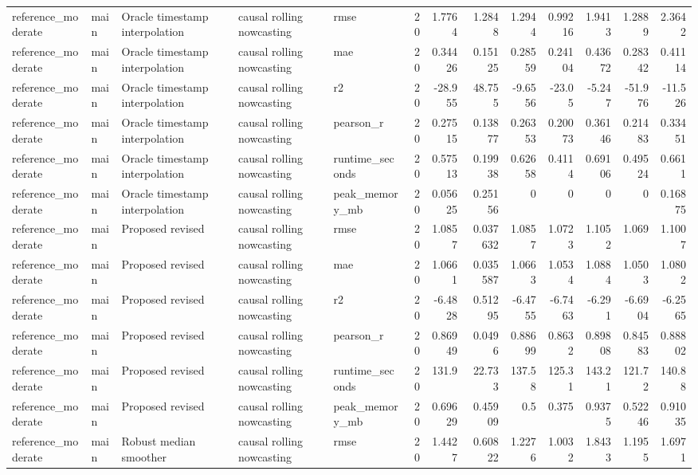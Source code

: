 \begin{table}[!htbp]
{{\begin{tabular}{lllllrrrrrrrr}
reference_moderate & main & Oracle timestamp interpolation & causal rolling nowcasting & rmse & 20 & 1.7764 & 1.2848 & 1.2944 & 0.99216 & 1.9413 & 1.2889 & 2.3642 \\
reference_moderate & main & Oracle timestamp interpolation & causal rolling nowcasting & mae & 20 & 0.34426 & 0.15125 & 0.28559 & 0.24104 & 0.43672 & 0.28342 & 0.41114 \\
reference_moderate & main & Oracle timestamp interpolation & causal rolling nowcasting & r2 & 20 & -28.955 & 48.755 & -9.6556 & -23.05 & -5.247 & -51.976 & -11.526 \\
reference_moderate & main & Oracle timestamp interpolation & causal rolling nowcasting & pearson_r & 20 & 0.27515 & 0.13877 & 0.26353 & 0.20073 & 0.36146 & 0.21483 & 0.33451 \\
reference_moderate & main & Oracle timestamp interpolation & causal rolling nowcasting & runtime_seconds & 20 & 0.57513 & 0.19938 & 0.62658 & 0.4114 & 0.69106 & 0.49524 & 0.6611 \\
reference_moderate & main & Oracle timestamp interpolation & causal rolling nowcasting & peak_memory_mb & 20 & 0.05625 & 0.25156 & 0 & 0 & 0 & 0 & 0.16875 \\
reference_moderate & main & Proposed revised & causal rolling nowcasting & rmse & 20 & 1.0857 & 0.037632 & 1.0857 & 1.0723 & 1.1052 & 1.069 & 1.1007 \\
reference_moderate & main & Proposed revised & causal rolling nowcasting & mae & 20 & 1.0661 & 0.035587 & 1.0663 & 1.0534 & 1.0884 & 1.0503 & 1.0802 \\
reference_moderate & main & Proposed revised & causal rolling nowcasting & r2 & 20 & -6.4828 & 0.51295 & -6.4755 & -6.7463 & -6.291 & -6.6904 & -6.2565 \\
reference_moderate & main & Proposed revised & causal rolling nowcasting & pearson_r & 20 & 0.86949 & 0.0496 & 0.88699 & 0.8632 & 0.89808 & 0.84583 & 0.88802 \\
reference_moderate & main & Proposed revised & causal rolling nowcasting & runtime_seconds & 20 & 131.9 & 22.733 & 137.58 & 125.31 & 143.21 & 121.72 & 140.88 \\
reference_moderate & main & Proposed revised & causal rolling nowcasting & peak_memory_mb & 20 & 0.69629 & 0.45909 & 0.5 & 0.375 & 0.9375 & 0.52246 & 0.91035 \\
reference_moderate & main & Robust median smoother & causal rolling nowcasting & rmse & 20 & 1.4427 & 0.60822 & 1.2276 & 1.0032 & 1.8433 & 1.1955 & 1.6971 \\

\end{tabular}}}
\end{table}
